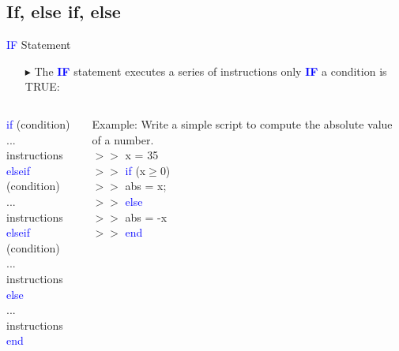 \documentclass[xcolor={dvipsnames,rgb}, aspectratio=169]{beamer}
\begin{document}
\subsection{If, else if, else}
\begin{frame}{\textcolor{blue}{IF} Statement}
    \begin{itemize}
        \item[$\blacktriangleright$] The \textcolor{blue}{\textbf{IF}} statement executes a
              series of instructions only \textcolor{blue}{\textbf{IF}} a condition is TRUE:
    \end{itemize}

    \begin{columns}
        \begin{tcolorbox}[colback=white,colframe=bluepoli]
            \textcolor{blue}{if} (condition)\\
            ... instructions\\
            \textcolor{blue}{elseif} (condition)\\
            ... instructions \\
            \textcolor{blue}{elseif} (condition)\\
            ... instructions \\
            \textcolor{blue}{else}\\
            ... instructions \\
            \textcolor{blue}{end}
        \end{tcolorbox}
        \begin{tcolorbox}[colback=white,colframe=bluepoli]
            \textcolor{mylilas}{Example: Write a simple script to compute the absolute value of
                a number.}\\
            $>>$ x = 35\\
            $>>$ \textcolor{blue}{if} (x$\ge$0)\\
            $>>$ \hspace{1em}abs = x;\\
            $>>$ \textcolor{blue}{else}\\
            $>>$ \hspace{1em}abs = -x\\
            $>>$ \textcolor{blue}{end}
        \end{tcolorbox}
    \end{columns}
\end{frame}
\end{document}
